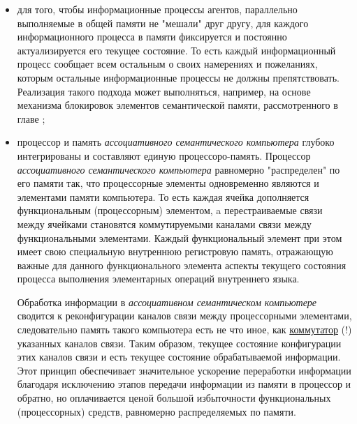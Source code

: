 \begin{itemize}
	\item для того, чтобы информационные процессы агентов, параллельно выполняемые в общей памяти не "мешали"{} друг другу, для каждого информационного процесса в памяти фиксируется и постоянно актуализируется его текущее состояние. То есть каждый информационный процесс сообщает всем остальным о своих намерениях и пожеланиях, которым остальные информационные процессы не должны препятствовать. Реализация такого подхода может выполняться, например, на основе механизма блокировок элементов семантической памяти, рассмотренного в главе ;
	\item процессор и память \textit{ассоциативного семантического компьютера} глубоко интегрированы и составляют единую процессоро-память. Процессор \textit{ассоциативного семантического компьютера} равномерно "распределен"{} по его памяти так, что процессорные элементы одновременно являются и элементами памяти компьютера. То есть каждая ячейка дополняется функциональным (процессорным) элементом, a перестраиваемые связи между ячейками становятся коммутируемыми каналами связи между функциональными элементами. Каждый функциональный элемент при этом имеет свою специальную внутреннюю регистровую память, отражающую важные для данного функционального элемента аспекты текущего состояния процесса выполнения элементарных операций внутреннего языка.

	Обработка информации в \textit{ассоциативном семантическом компьютере} сводится к реконфигурации каналов связи между процессорными элементами,  следовательно память такого компьютера есть не что иное, как \uline{коммутатор} (!) указанных каналов связи. Таким образом, текущее состояние конфигурации этих каналов связи и есть текущее состояние обрабатываемой информации. Этот принцип обеспечивает значительное ускорение переработки информации благодаря исключению этапов передачи информации из памяти в процессор и обратно, но оплачивается ценой большой избыточности функциональных (процессорных) средств, равномерно распределяемых по памяти.
	
\end{itemize}
		
%